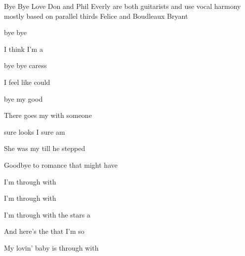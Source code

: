 \begin{SBSong}{Bye Bye Love}
  {Don and Phil Everly are both guitarists and use vocal harmony mostly based on parallel thirds}
  {Felice and Boudleaux Bryant}
  \begin{SBChorus}
     bye   bye   
	
      I think I'm a   
	
     bye   bye  caress 
	
      I feel like  could 
	
     bye my  good 
  \end{SBChorus}
  \begin{SBVerse}
    There goes my  with someone 
	
     sure looks  I sure am  
	
    She was my  till he stepped   
	
    Goodbye to romance that might have   
  \end{SBVerse}
  \begin{SBVerse}
    I'm through with 
    
    I'm through with  
	
    I'm through with  the stars a   
	
    And here's the  that I'm so 
	
    My lovin' baby is through with   
  \end{SBVerse}
\end{SBSong}